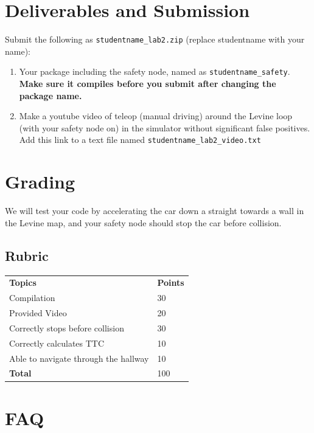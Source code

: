 \documentclass[letta4 paper]{article}
\numberwithin{equation}{section}
\newcommand{\0}{\mathbf{0}}
\begin{document}
	\section{Deliverables and Submission}
	
	Submit the following as \texttt{studentname\_lab2.zip} (replace studentname with your name):
	

	\begin{enumerate}
		\item Your package including the safety node, named as \texttt{studentname\_safety}. \textbf{Make sure it compiles before you submit after changing the package name.}
		\item Make a youtube video of teleop (manual driving) around the Levine loop (with your safety node on) in the simulator without significant false positives. Add this link to a text file named \texttt{studentname\_lab2\_video.txt}
	\end{enumerate}

	\section{Grading}
	
	We will test your code by accelerating the car down a straight towards a wall in the Levine map, and your safety node should stop the car before collision.
	
	\subsection{Rubric}
	\begin{table}[h]
		\begin{tabular}{ll}
			\textbf{Topics} & \textbf{Points} \\
			Compilation & 30 \\
			Provided Video & 20 \\
			Correctly stops before collision & 30 \\
			Correctly calculates TTC & 10 \\
			Able to navigate through the hallway & 10 \\
			\textbf{Total} & 100 \\
		\end{tabular}
	\end{table}
	
	\newpage
	\section{FAQ}
		
\end{document}
